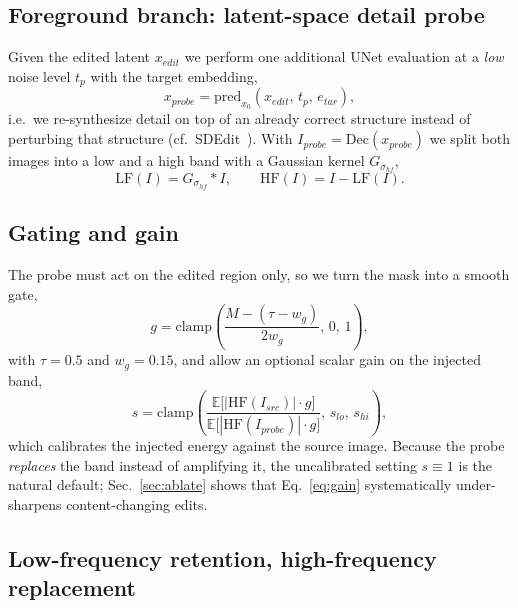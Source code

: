 \documentclass[10pt,twocolumn,letterpaper]{article}
\newcommand{\HF}{\mathrm{HF}}
\newcommand{\LF}{\mathrm{LF}}
\newcommand{\Dec}{\mathrm{Dec}}
\begin{document}
\subsection{Foreground branch: latent-space detail probe}
\label{sec:probe}

Given the edited latent $x_{edit}$ we perform one additional UNet evaluation at a
\emph{low} noise level $t_{p}$ with the target embedding,
\begin{equation}
  x_{probe} = \mathrm{pred}_{x_0}\!\left(x_{edit},\,t_{p},\,e_{tar}\right),
  \label{eq:probe}
\end{equation}
i.e.\ we re-synthesize detail on top of an already correct structure instead of
perturbing that structure (cf.\ SDEdit~\cite{sdedit}). With
$I_{probe}=\Dec(x_{probe})$ we split both images into a low and a high band with a
Gaussian kernel $G_{\sigma_{hf}}$,
\begin{equation}
  \LF(I)=G_{\sigma_{hf}}*I,\qquad \HF(I)=I-\LF(I).
\end{equation}

\subsection{Gating and gain}
\label{sec:gate}

The probe must act on the edited region only, so we turn the mask into a smooth
gate,
\begin{equation}
  g = \mathrm{clamp}\!\left(\frac{M-(\tau-w_{g})}{2w_{g}},\,0,\,1\right),
  \label{eq:gate}
\end{equation}
with $\tau=0.5$ and $w_{g}=0.15$, and allow an optional scalar gain on the
injected band,
\begin{equation}
  s = \mathrm{clamp}\!\left(
      \frac{\mathbb{E}\bigl[|\HF(I_{src})|\cdot g\bigr]}
           {\mathbb{E}\bigl[|\HF(I_{probe})|\cdot g\bigr]},\,
      s_{lo},\,s_{hi}\right),
  \label{eq:gain}
\end{equation}
which calibrates the injected energy against the source image. Because the probe
\emph{replaces} the band instead of amplifying it, the uncalibrated setting
$s\equiv 1$ is the natural default; Sec.~\ref{sec:ablate} shows that
Eq.~\eqref{eq:gain} systematically under-sharpens content-changing edits.

\subsection{Low-frequency retention, high-frequency replacement}
\label{sec:lfhf}
\end{document}
